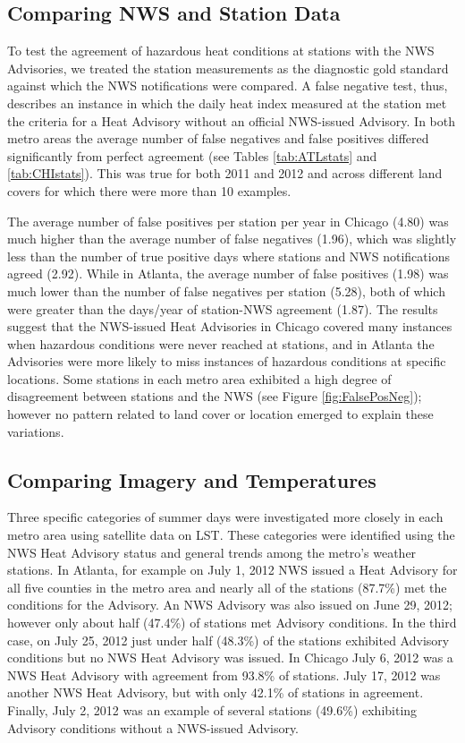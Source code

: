 \documentclass{ametsoc}
\begin{document}
\subsection{Comparing NWS and Station Data}\label{subsec:hyp1}

To test the agreement of hazardous heat conditions at stations with the NWS Advisories, we treated the station measurements as the diagnostic gold standard against which the NWS notifications were compared. A false negative test, thus, describes an instance in which the daily heat index measured at the station met the criteria for a Heat Advisory without an official NWS-issued Advisory. In both metro areas the average number of false negatives and false positives differed significantly from perfect agreement (see Tables \ref{tab:ATLstats} and \ref{tab:CHIstats}). This was true for both 2011 and 2012 and across different land covers for which there were more than 10 examples. 

The average number of false positives per station per year in Chicago (4.80) was much higher than the average number of false negatives (1.96), which was slightly less than the number of true positive days where stations and NWS notifications agreed (2.92).  While in Atlanta, the average number of false positives (1.98) was much lower than the number of false negatives per station (5.28), both of which were greater than the days/year of station-NWS agreement (1.87). The results suggest that the NWS-issued Heat Advisories in Chicago covered many instances when hazardous conditions were never reached at stations, and in Atlanta the Advisories were more likely to miss instances of hazardous conditions at specific locations. Some stations in each metro area exhibited a high degree of disagreement between stations and the NWS (see Figure \ref{fig:FalsePosNeg}); however no pattern related to land cover or location emerged to explain these variations. 

\subsection{Comparing Imagery and Temperatures}\label{subsec:LST}
Three specific categories of summer days were investigated more closely in each metro area using satellite data on LST. These categories were identified using the NWS Heat Advisory status and general trends among the metro's weather stations. In Atlanta, for example on July 1, 2012 NWS issued a Heat Advisory for all five counties in the metro area and nearly all of the stations (87.7\%) met the conditions for the Advisory. An NWS Advisory was also issued on June 29, 2012; however only about half (47.4\%) of stations met Advisory conditions. In the third case, on July 25, 2012 just under half (48.3\%) of the stations exhibited Advisory conditions but no NWS Heat Advisory was issued. In Chicago July 6, 2012 was a NWS Heat Advisory with agreement from 93.8\% of stations. July 17, 2012 was another NWS Heat Advisory, but with only 42.1\% of stations in agreement. Finally, July 2, 2012 was an example of several stations (49.6\%) exhibiting Advisory conditions without a NWS-issued Advisory. 
\end{document}
